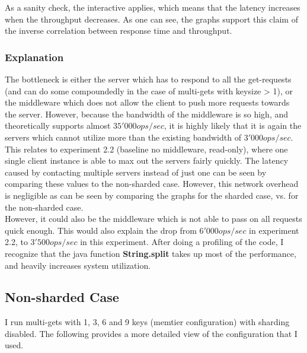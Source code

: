 \documentclass[11pt,a4paper]{article}
\begin{document}
As a sanity check, the interactive applies, which means that the latency increases when the throughput decreases.
As one can see, the graphs support this claim of the inverse correlation between response time and throughput.

\subsubsection{Explanation}

The bottleneck is either the server which has to respond to all the get-requests (and can do some compoundedly in the case of multi-gets with keysize > 1), or the middleware which does not allow the client to push more requests towards the server.
However, because the bandwidth of the middleware is so high, and theoretically supports almost $35'000 ops/sec$, it is highly likely that it is again the servers which cannot utilize more than the existing bandwidth of $3'000 ops/sec$.
This relates to experiment 2.2 (baseline no middleware, read-only), where one single client instance is able to max out the servers fairly quickly. 
The latency caused by contacting multiple servers instead of just one can be seen by comparing these values to the non-sharded case.
However, this network overhead is negligible as can be seen by comparing the graphs for the sharded case, vs. for the non-sharded case.
\\

However, it could also be the middleware which is not able to pass on all requests quick enough.
This would also explain the drop from $ 6'000 ops/sec $ in experiment 2.2, to $ 3'500 ops/sec$ in this experiment.
After doing a profiling of the code, I recognize that the java function \textbf{String.split} takes up most of the performance, and heavily increases system utilization.


\subsection{Non-sharded Case}

I run multi-gets with 1, 3, 6 and 9 keys (memtier configuration) with sharding disabled. 
The following provides a more detailed view of the configuration that I used.
\end{document}
